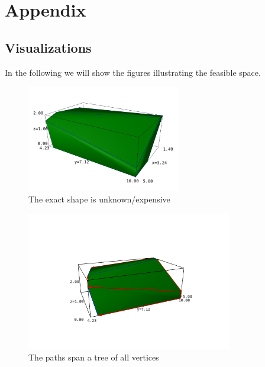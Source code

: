 \documentclass[a4paper, 11pt]{article}
\begin{document}
\newpage

\section{Appendix}
\subsection*{Visualizations}

In the following we will show the figures illustrating the feasible space. 

\begin{figure}[ht]
	\centering
	\includegraphics[width = 0.6\textwidth]{../presentation/allMeals2.png}
	\caption{The exact shape is unknown/expensive}
\end{figure}

\begin{figure}[ht]
	\includegraphics[width = 0.8\textwidth]{../presentation/Polytope_tree.png}
	\caption{The paths span a tree of all vertices}
\end{figure}
\end{document}
